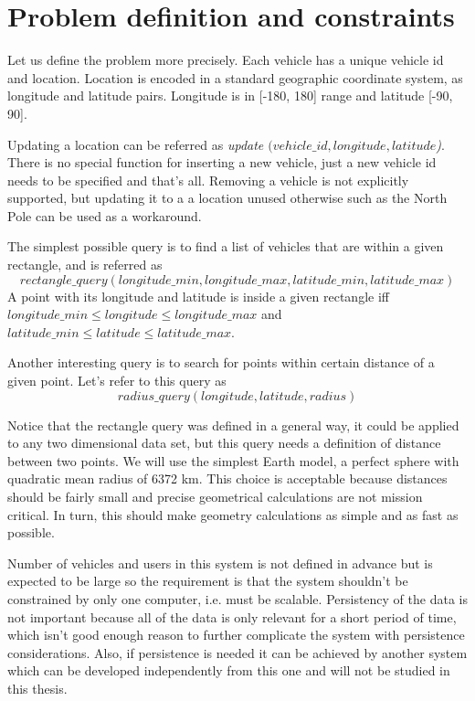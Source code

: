 \documentclass[times, utf8, diplomski]{fer}
\begin{document}
\section{Problem definition and constraints}
Let us define the problem more precisely. Each vehicle has a unique vehicle id and location. Location is encoded in a standard geographic coordinate system, as longitude and latitude pairs. Longitude is in [-180, 180] range and latitude [-90, 90].

Updating a location can be referred as \emph{update $(vehicle\_id, longitude, latitude$)}. There is no special function for inserting a new vehicle, just a new vehicle id needs to be specified and that's all. Removing a vehicle is not explicitly supported, but updating it to a a location unused otherwise such as the North Pole can be used as a workaround.

The simplest possible query is to find a list of vehicles that are within a given rectangle, and is referred as
$$rectangle\_query (longitude\_min, longitude\_max, latitude\_min, latitude\_max)$$
A point with its longitude and latitude is inside a given rectangle iff $longitude\_min \le longitude \le longitude\_max$ and $latitude\_min \le latitude \le latitude\_max$.

Another interesting query is to search for points within certain distance of a given point.  Let's refer to this query as
$$radius\_query (longitude, latitude, radius)$$

Notice that the rectangle query was defined in a general way, it could be applied to any two dimensional data set, but this query needs a definition of distance between two points. We will use the simplest Earth model, a perfect sphere with quadratic mean radius of 6372 km. This choice is acceptable because distances should be fairly small and precise geometrical calculations are not mission critical. In turn, this should make geometry calculations as simple and as fast as possible.

Number of vehicles and users in this system is not defined in advance but is expected to be large so the requirement is that the system shouldn't be constrained by only one computer, i.e. must be scalable. Persistency of the data is not important because all of the data is only relevant for a short period of time, which isn't good enough reason to further complicate the system with persistence considerations. Also, if persistence is needed it can be achieved by another system which can be developed independently from this one and will not be studied in this thesis. 
\end{document}
